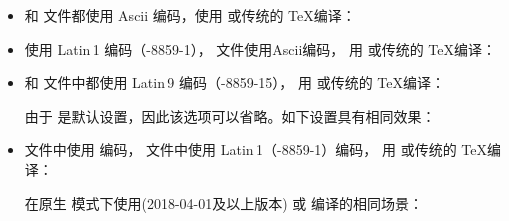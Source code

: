 \begin{itemize}
\setlength{\itemsep}{0pt}

\item
 和  文件都使用 Ascii 编码，使用 \pdfTeX 或传统的 \TeX 编译：

\begin{ltxexample}
\usepackage{biblatex}
\end{ltxexample}

\item
 使用 Latin\,1 编码（-8859-1）， 文件使用Ascii编码，
用 \pdfTeX 或传统的 \TeX 编译：

\begin{ltxexample}
\usepackage[latin1]{inputenc}
\usepackage[bibencoding=ascii]{biblatex}
\end{ltxexample}

\item
 和  文件中都使用 Latin\,9 编码（-8859-15），
用 \pdfTeX 或传统的 \TeX 编译：

\begin{ltxexample}
\usepackage[latin9]{inputenc}
\usepackage[bibencoding=auto]{biblatex}
\end{ltxexample}
%
由于  是默认设置，因此该选项可以省略。如下设置具有相同效果：

\begin{ltxexample}
\usepackage[latin9]{inputenc}
\usepackage{biblatex}
\end{ltxexample}

\item
 文件中使用 \utf 编码， 文件中使用 Latin\,1（-8859-1）编码，
用 \pdfTeX 或传统的 \TeX 编译：

\begin{ltxexample}
\usepackage[utf8]{inputenc}
\usepackage[bibencoding=latin1]{biblatex}
\end{ltxexample}

在原生 \utf 模式下使用\latex (2018-04-01及以上版本) \XeTeX 或 \LuaTeX 编译的相同场景：

\begin{ltxexample}
\usepackage[bibencoding=latin1]{biblatex}
\end{ltxexample}

\end{itemize}

